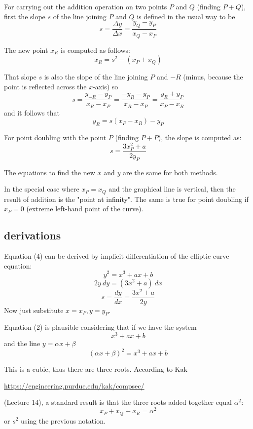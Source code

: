 \documentclass[11pt, oneside]{article}
\begin{document}
For carrying out the addition operation on two points $P$ and $Q$ (finding $P + Q$), first the slope $s$ of the line joining $P$ and $Q$ is defined in the usual way to be
\begin{equation}
s = \frac{\Delta y}{\Delta x} = \frac{y_Q - y_P}{x_Q - x_P}
\end{equation}

The new point $x_R$ is computed as follows:
\begin{equation}
x_R = s^2 - (x_P + x_Q)
\end{equation}

That slope $s$ is also the slope of the line joining $P$ and $-R$ (minus, because the point is reflected across the $x$-axis) so
\[ s = \frac{y_{-R} - y_P}{x_R - x_P} = \frac{-y_R - y_P}{x_R - x_P} = \frac{y_R + y_P}{x_P - x_R} \]
and it follows that 
\begin{equation}
y_R = s(x_P - x_R) - y_P
\end{equation}

For point doubling with the point $P$ (finding $P + P$), the slope is computed as:
\begin{equation}
s = \frac{3x_P^2 + a}{2y_P}
\end{equation}

The equations to find the new $x$ and $y$ are the same for both methods.

In the special case where $x_P = x_Q$ and the graphical line is vertical, then the result of addition is the "point at infinity".  The same is true for point doubling if $x_P = 0$ (extreme left-hand point of the curve).

\subsection*{derivations}

Equation (4) can be derived by implicit differentiation of the elliptic curve equation:
\[ y^2 = x^3 + ax + b \]
\[ 2y \ dy = (3x^2 + a) \ dx \]
\[ s = \frac{dy}{dx} = \frac{3x^2 + a}{2y} \]
Now just substitute $x = x_P, y = y_P$.

Equation (2) is plausible considering that if we have the system
\[ x^3 + ax + b \]
and the line $y = \alpha x + \beta$
\[ (\alpha x + \beta)^2 = x^3 + ax + b \]

This is a cubic, thus there are three roots.  According to Kak

\url{https://engineering.purdue.edu/kak/compsec/}

(Lecture 14), a standard result is that the three roots added together equal $\alpha^2$:
\[ x_P + x_Q + x_R = \alpha^2 \]
or $s^2$ using the previous notation.
\end{document}
